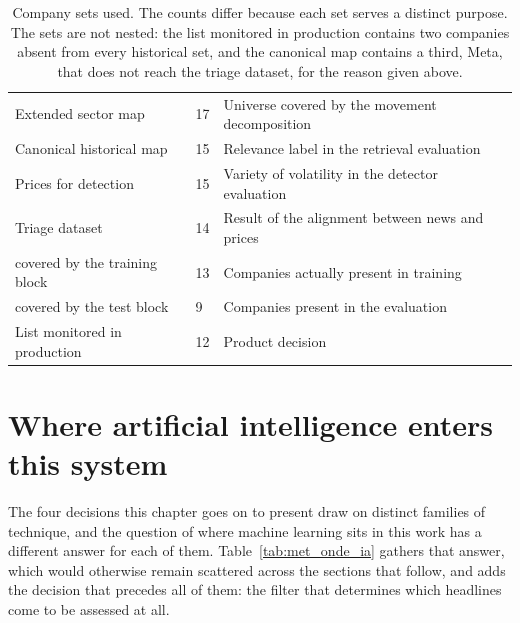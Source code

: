 \begin{table}[!htbp]
\caption[Company sets]{Company sets used. The counts differ because each set serves a distinct
purpose. The sets are not nested: the list monitored in production contains two companies absent
from every historical set, and the canonical map contains a third, Meta, that does not reach
the triage dataset, for the reason given above.}
\label{tab:met_universos}
\centering
\small
\begin{tabular}{L{0.30\textwidth} C{0.10\textwidth} L{0.48\textwidth}}
\toprule
{} &  &  \\
\midrule
Extended sector map & 17 & Universe covered by the movement decomposition \\
Canonical historical map & 15 & Relevance label in the retrieval evaluation \\
Prices for detection & 15 & Variety of volatility in the detector evaluation \\
Triage dataset & 14 & Result of the alignment between news and prices \\
\quad covered by the training block & 13 & Companies actually present in training \\
\quad covered by the test block & 9 & Companies present in the evaluation \\
List monitored in production & 12 & Product decision \\
\bottomrule
\end{tabular}
\end{table}

\section{Where artificial intelligence enters this system}
\label{sec:met_onde_ia}

The four decisions this chapter goes on to present draw on distinct families of technique, and
the question of where machine learning sits in this work has a different answer for each of
them. Table~\ref{tab:met_onde_ia}
gathers that answer, which would otherwise remain scattered across the sections that follow, and
adds the decision that precedes all of them: the filter that determines which headlines come to
be assessed at all.

